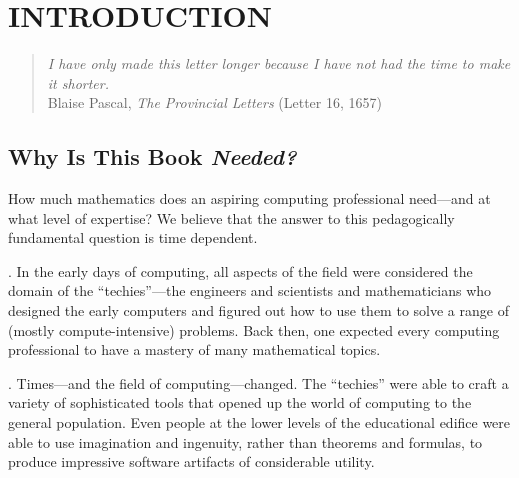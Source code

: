 
\chapter{INTRODUCTION}
\label{ch:intro}

\begin{quote}
{\em I have only made this letter longer because I have not had the
  time to make it shorter.}  \\
\hspace*{1.5in}Blaise Pascal, {\it The Provincial Letters}
(Letter 16, 1657)
\end{quote}


\section{Why Is This Book {\em Needed?}}
\label{sec:bookneeded}

How much mathematics does an aspiring computing professional
need---and at what level of expertise?  We believe that the answer to
this pedagogically fundamental question is time dependent.

\medskip

.
In the early days of computing, all aspects of the field were
considered the domain of the ``techies''---the engineers and
scientists and mathematicians who designed the early computers and
figured out how to use them to solve a range of (mostly
compute-intensive) problems.  Back then, one expected every computing
professional to have a mastery of many mathematical topics.

\medskip

.
Times---and the field of computing---changed.  The ``techies'' were
able to craft a variety of sophisticated tools that opened up the
world of computing to the general population.  Even people at the
lower levels of the educational edifice were able to use imagination
and ingenuity, rather than theorems and formulas, to produce
impressive software artifacts of considerable utility.

\medskip

